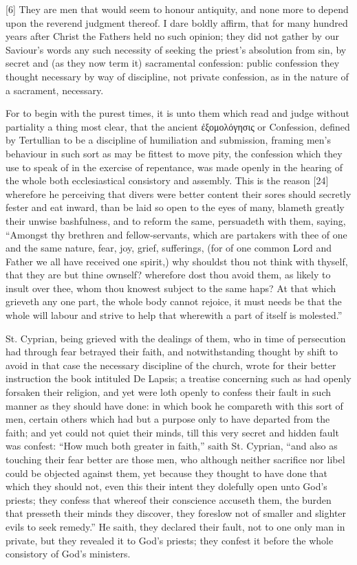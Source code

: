 [6] They are men that would seem to honour antiquity, and none more to depend upon the reverend judgment thereof. I dare boldly affirm, that for many hundred years after Christ the Fathers held no such opinion; they did not gather by our Saviour’s words any such necessity of seeking the priest’s absolution from sin, by secret and (as they now term it) sacramental confession: public confession they thought necessary by way of discipline, not private confession, as in the nature of a sacrament, necessary.

For to begin with the purest times, it is unto them which read and judge without partiality a thing most clear, that the ancient ἐξομολόγησις or Confession, defined by Tertullian to be a discipline of humiliation and submission, framing men’s behaviour in such sort as may be fittest to move pity, the confession which they use to speak of in the exercise of repentance, was made openly in the hearing of the whole both ecclesiastical consistory and assembly. This is the reason [24] wherefore he perceiving that divers were better content their sores should secretly fester and eat inward, than be laid so open to the eyes of many, blameth greatly their unwise bashfulness, and to reform the same, persuadeth with them, saying, “Amongst thy brethren and fellow-servants, which are partakers with thee of one and the same nature, fear, joy, grief, sufferings, (for of one common Lord and Father we all have received one spirit,) why shouldst thou not think with thyself, that they are but thine ownself? wherefore dost thou avoid them, as likely to insult over thee, whom thou knowest subject to the same haps? At that which grieveth any one part, the whole body cannot rejoice, it must needs be that the whole will labour and strive to help that wherewith a part of itself is molested.”

St. Cyprian, being grieved with the dealings of them, who in time of persecution had through fear betrayed their faith, and notwithstanding thought by shift to avoid in that case the necessary discipline of the church, wrote for their better instruction the book intituled De Lapsis; a treatise concerning such as had openly forsaken their religion, and yet were loth openly to confess their fault in such manner as they should have done: in which book he compareth with this sort of men, certain others which had but a purpose only to have departed from the faith; and yet could not quiet their minds, till this very secret and hidden fault was confest: “How much both greater in faith,” saith St. Cyprian, “and also as touching their fear better are those men, who although neither sacrifice nor libel could be objected against them, yet because they thought to have done that which they should not, even this their intent they dolefully open unto God’s priests; they confess that whereof their conscience accuseth them, the burden that presseth their minds they discover, they foreslow not of smaller and slighter evils to seek remedy.” He saith, they declared their fault, not to one only man in private, but they revealed it to God’s priests; they confest it before the whole consistory of God’s ministers.

